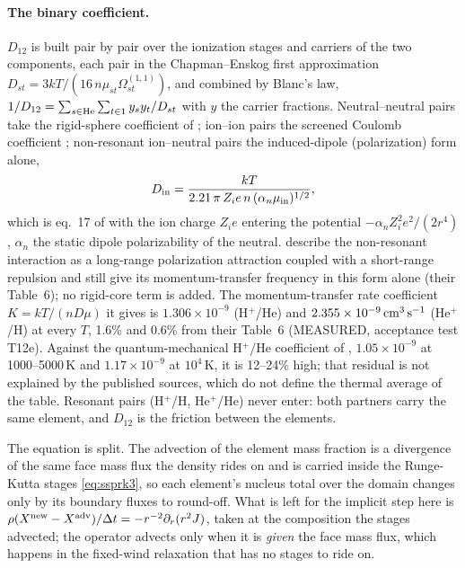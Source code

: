 \paragraph{The binary coefficient.}
$D_{12}$ is built pair by pair over the ionization stages and carriers of the
two components, each pair in the Chapman--Enskog first approximation
$D_{st} = 3kT/(16\,n\mu_{st}\Omega^{(1,1)}_{st})$, and combined by Blanc's law,
$1/D_{12} = \sum_{s\in{\rm He}}\sum_{t\in 1} y_sy_t/D_{st}$ with $y$ the
carrier fractions. Neutral--neutral pairs take the rigid-sphere coefficient of
\citet{Banks1973}; ion--ion pairs the screened Coulomb coefficient
\citep[eq.~C2]{Schunk1977}; non-resonant ion--neutral pairs the induced-dipole
(polarization) form alone,
\begin{equation}
D_{\rm in} = \frac{kT}{2.21\,\pi\,Z_ie\,n\,(\alpha_n\mu_{\rm in})^{1/2}},
\label{eq:mol:polarization}
\end{equation}
which is eq.~17 of \citet{Schunk1980} with the ion charge $Z_ie$ entering the
potential $-\alpha_nZ_i^2e^2/(2r^4)$, $\alpha_n$ the static dipole
polarizability of the neutral. \citet{Schunk1980} describe the non-resonant
interaction as a long-range polarization attraction coupled with a short-range
repulsion and still give its momentum-transfer frequency in this form alone
(their Table~6); no rigid-core term is added. The momentum-transfer rate
coefficient $K = kT/(nD\mu)$ it gives is $1.306\times10^{-9}$ (H$^+$/He) and
$2.355\times10^{-9}\,{\rm cm^3\,s^{-1}}$ (He$^+$/H) at every $T$, 1.6\% and
0.6\% from their Table~6 (MEASURED, acceptance test T12e). Against the
quantum-mechanical H$^+$/He coefficient of \citet{Kimura1993}, $1.05\times10^{-9}$
at 1000--5000\,K and $1.17\times10^{-9}$ at $10^4$\,K, it is 12--24\% high;
that residual is not explained by the published sources, which do not define
the thermal average of the table. Resonant pairs (H$^+$/H, He$^+$/He) never
enter: both partners carry the same element, and $D_{12}$ is the friction
between the elements.

The equation is split. The advection of the element mass fraction is a
divergence of the same face mass flux the density rides on and is carried
inside the Runge-Kutta stages \eqref{eq:ssprk3}, so each element's nucleus total over the
domain changes only by its boundary fluxes to round-off. What is left for
the implicit step here is
$\rho(X^{\rm new}-X^{\rm adv})/\Delta t = -r^{-2}\partial_r(r^{2}J)$, taken
at the composition the stages advected; the operator advects only when it is
\emph{given} the face mass flux, which happens in the fixed-wind relaxation
that has no stages to ride on.

